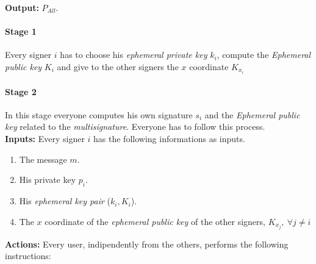 \textbf{Output:} $P_{All}$.

\paragraph{Stage 1}

Every signer $i$ has to choose his \textit{ephemeral private key} $k_{i}$, compute the \textit{Ephemeral public key} $K_{i}$ and give to the other signers the $x$ coordinate $K_{x_{i}}$

\paragraph{Stage 2}
In this stage everyone computes his own signature $s_{i}$ and the \textit{Ephemeral public key} related to the \textit{multisignature}. Everyone has to follow this process.\\
\textbf{Inputs:} Every signer $i$ has the following informations as inputs.

\hspace{1.1cm}
\begin{minipage}[l]{2\linewidth}
	\begin{enumerate}
		\item The message $m$.
		\item His private key $p_{i}$.
		\item His \textit{ephemeral key pair} ($k_{i}, K_{i}$).
		\item The $x$ coordinate of the \textit{ephemeral public key} of the other signers, $K_{x_{j}},\ \forall j\neq i$
	\end{enumerate}
\end{minipage}


\textbf{Actions:} Every user, indipendently from the others, performs the following instructions:

